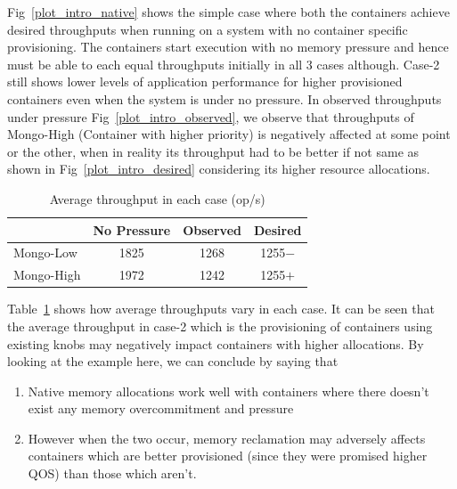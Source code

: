	Fig~\ref{plot_intro_native} shows the simple case where both the containers achieve desired throughputs when running on a system 
with no container specific provisioning. The containers start execution with no memory pressure and hence must be able to each equal 
throughputs initially in all 3 cases although. Case-2 still shows lower levels of application performance for higher provisioned 
containers even when the system is under no pressure. In observed throughputs under pressure Fig~\ref{plot_intro_observed}, we 
observe that throughputs of Mongo-High (Container with higher priority) is negatively affected at some point or the other, when in reality 
its throughput had to be better if not same as shown in Fig~\ref{plot_intro_desired} considering its higher resource allocations. 
	
	\pagebreak

	\begin{table}
	  \begin{center}
	    \begin{tabular}{ l | c | c | c }	      	    
		  & No Pressure & Observed & Desired \\ 
	      \hline
	      \hline
	      Mongo-Low  & 1825 & 1268 & 1255$-$ \\  
	      \hline
	      Mongo-High & 1972 & 1242 & 1255$+$ \\
		
	    \end{tabular}
	  \caption{Average throughput in each case (op/s)}
	  \label{table_intro_th}
	  \end{center}	  
	\end{table}
	
	Table~\ref{table_intro_th} shows how average throughputs vary in each case. It can be seen that the average throughput in case-2 
which is the provisioning of containers using existing knobs may negatively impact containers with higher allocations. By looking at the 
example here, we can conclude by saying that 
	
	\begin{enumerate}
	  \item Native memory allocations work well with containers where there doesn't exist any memory overcommitment and pressure
	  \item However when the two occur, memory reclamation may adversely affects containers which are better provisioned (since they 
were promised higher QOS) than those which aren't.
	\end{enumerate}
    
